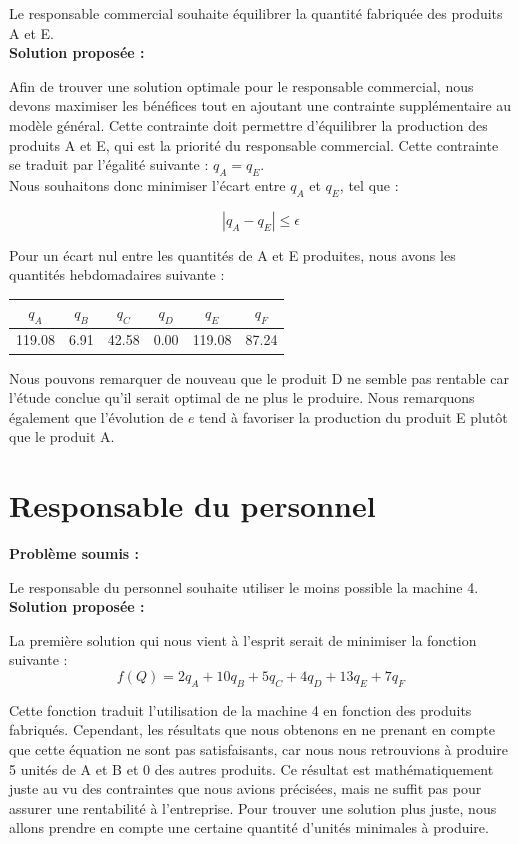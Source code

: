 \documentclass[paper=a4, fontsize=11pt]{report}
\numberwithin{equation}{section}		%
\numberwithin{figure}{section}			%
\numberwithin{table}{section}				%
\renewcommand{\bf}[1]{\textbf{#1}}
\newcommand\abs[1]{\left|#1\right|}
\begin{document}
Le responsable commercial souhaite équilibrer la quantité fabriquée des produits A et E.\\

\bf{Solution proposée :}

Afin de trouver une solution optimale pour le responsable commercial, nous devons maximiser les bénéfices tout en ajoutant une contrainte supplémentaire au modèle général. Cette contrainte doit permettre d'équilibrer la production des produits A et E, qui est la priorité du responsable commercial. Cette contrainte se traduit par l'égalité suivante : $q_A = q_E$. \\

Nous souhaitons donc minimiser l'écart entre $q_A$ et $q_E$, tel que :

\[ \abs{q_A - q_E} \leq \epsilon \] 

Pour un écart nul entre les quantités de A et E produites, nous avons les quantités hebdomadaires suivante :
\begin{center}
\begin{tabular}{cccccc}
\hline
$q_A$ & $q_B$ & $q_C$ & $q_D$ & $q_E$ & $q_F$ \\
\hline
119.08 & 6.91 & 42.58 & 0.00 & 119.08 & 87.24 \\
\hline
\end{tabular}
\end{center}

Nous pouvons remarquer de nouveau que le produit D ne semble pas rentable car l'étude conclue qu'il serait optimal de ne plus le produire. Nous remarquons également que l’évolution de $e$ tend à favoriser la production du produit E plutôt que le produit A.

\section{Responsable du personnel}
\bf{Problème soumis :}

Le responsable du personnel souhaite utiliser le moins possible la machine 4.\\

\bf{Solution proposée :}

La première solution qui nous vient à l’esprit serait de minimiser la fonction suivante : \[f(Q) = 2q_A + 10q_B + 5q_C + 4q_D + 13q_E + 7q_F\]

Cette fonction traduit l'utilisation de la machine 4 en fonction des produits fabriqués. Cependant, les résultats que nous obtenons en ne prenant en compte que cette équation ne sont pas satisfaisants, car nous nous retrouvions à produire 5 unités de A et B et 0 des autres produits. Ce résultat est mathématiquement juste au vu des contraintes que nous avions précisées, mais ne suffit pas pour assurer une rentabilité à l’entreprise. Pour trouver une solution plus juste, nous allons prendre en compte une certaine quantité d’unités minimales à produire. \\
\end{document}

